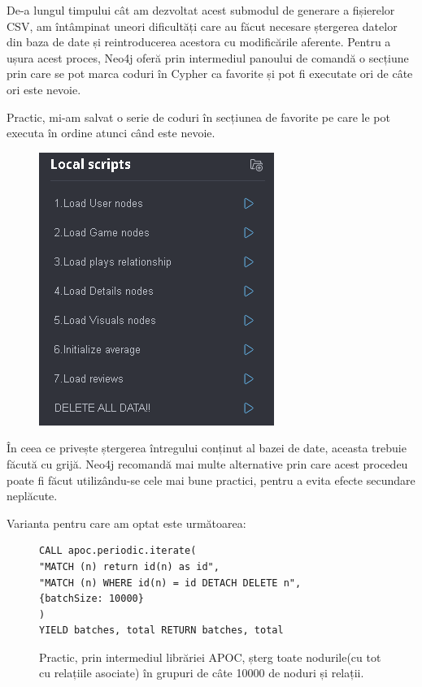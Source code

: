 \documentclass[12pt,a4paper]{report}
\begin{document}
De-a lungul timpului cât am dezvoltat acest submodul de generare a fișierelor CSV, am întâmpinat uneori dificultăți care au făcut necesare ștergerea datelor din baza de date și reintroducerea acestora cu modificările aferente. Pentru a ușura acest proces, Neo4j oferă prin intermediul panoului de comandă o secțiune prin care se pot marca coduri în Cypher ca favorite și pot fi executate ori de câte ori este nevoie.

Practic, mi-am salvat o serie de coduri în secțiunea de favorite pe care le pot executa în ordine atunci când este nevoie. 

\begin{figure}[H]
\centering
\caption{}
\begin{adjustbox}{max size={\textwidth}{\textheight}}
\includegraphics[scale = 0.75]{exemplu_15_favorites}
\end{adjustbox}
\caption*{}
\end{figure}

\newpage

În ceea ce privește ștergerea întregului conținut al bazei de date, aceasta trebuie făcută cu grijă. Neo4j recomandă mai multe alternative prin care acest procedeu poate fi făcut utilizându-se cele mai bune practici, pentru a evita efecte secundare neplăcute. \cite{19}

Varianta pentru care am optat este următoarea:

\begin{figure}[H]
\centering
\begin{BVerbatim}
CALL apoc.periodic.iterate(
"MATCH (n) return id(n) as id",
"MATCH (n) WHERE id(n) = id DETACH DELETE n", 
{batchSize: 10000}
)
YIELD batches, total RETURN batches, total
\end{BVerbatim}
\caption*{Practic, prin intermediul librăriei APOC, șterg toate nodurile(cu tot cu relațiile asociate) în grupuri de câte 10000 de noduri și relații.}
\end{figure}
\end{document}
